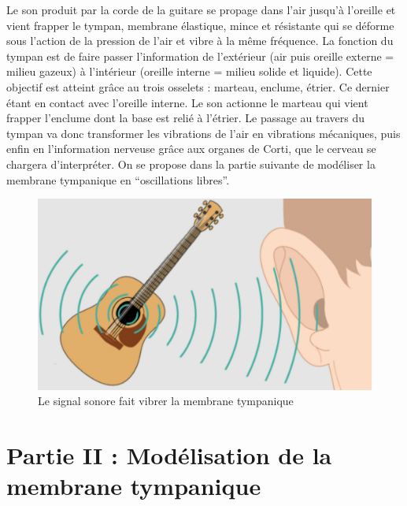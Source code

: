 \documentclass[a4,12pt]{article}
\begin{document}
Le son produit par la corde de la guitare se propage dans l'air jusqu'à l'oreille et vient frapper le tympan, membrane élastique, mince et résistante qui se déforme sous l'action de la pression de l'air et vibre à la même fréquence. La fonction du tympan est de faire passer l'information de l'extérieur (air puis oreille externe = milieu gazeux) à l'intérieur (oreille interne = milieu solide et liquide). Cette objectif est atteint grâce au trois osselets : marteau, enclume, étrier. Ce dernier étant en contact avec l'oreille interne. Le son actionne le marteau qui vient frapper l'enclume dont la base est relié à l'étrier. Le passage au travers du tympan va donc transformer les vibrations de l'air en vibrations mécaniques, puis enfin en l'information nerveuse grâce aux organes de Corti, que le cerveau se chargera d'interpréter. On se propose dans la partie suivante de modéliser la membrane tympanique en \enquote{oscillations libres}.

\begin{figure}[H]
	\begin{center}
		\includegraphics[scale=0.3]{images/transition.pdf}
		\caption{Le signal sonore fait vibrer la membrane tympanique}
		\label{fig:transition}
	\end{center}
\end{figure}

\newpage


\section*{Partie II : Modélisation de la membrane tympanique}
\end{document}
